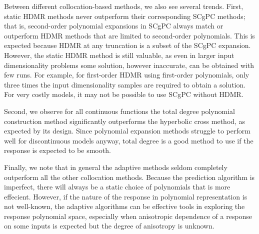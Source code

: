 Between different collocation-based methods, we also see several trends.  First, static HDMR methods never outperform their
corresponding SCgPC methods; that is, second-order polynomial expansions in SCgPC always match or outperform HDMR methods
that are limited to second-order polynomials.  This is expected because HDMR at any truncation is a subset of the SCgPC
expansion.  However, the static HDMR method is still valuable, as even in larger input dimensionality problems
some solution, however inaccurate,
can be obtained with few runs.  For example, for first-order HDMR using first-order polynomials, only three times the input
dimensionality samples are required to obtain a solution.  For very costly models, it may not be possible to use SCgPC without
HDMR.

Second, we observe for all continuous functions the total degree polynomial construction method significantly outperforms
the hyperbolic cross method, as expected by its design.  Since polynomial expansion methods struggle to perform well for
discontinuous models anyway, total degree is a good method to use if the response is expected to be smooth.

Finally, we note that in general the adaptive methods seldom completely outperform all the other collocation methods.  Because the
prediction algorithm is imperfect, there will always be a static choice of polynomials that is more effecient.  However, if
the nature of the response in polynomial representation is not well-known, the adaptive algorithms can be effective tools in
exploring the response polynomial space, especially when anisotropic dependence of a response on some inputs
is expected but the degree of anisotropy is unknown.

